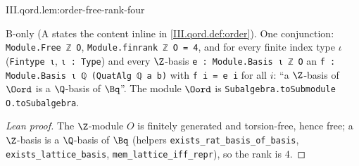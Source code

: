 \begin{lemma}
\bonly
{}
\end{lemma}
\begin{tfformal}{III.qord.lem:order-free-rank-four}
\begin{tffidelity}
B-only (A states the content inline in \cref{III.qord.def:order}). One conjunction: \texttt{Module.Free ℤ O}, \texttt{Module.finrank ℤ O = 4}, and for every finite index type $\iota$ (\texttt{Fintype ι}, \texttt{ι : Type}) and every $\Z$-basis \texttt{e : Module.Basis ι ℤ O} an \texttt{f : Module.Basis ι ℚ (QuatAlg ℚ a b)} with \texttt{f i = e i} for all $i$: ``a $\Z$-basis of $\Oord$ is a $\Q$-basis of $\Bq$''. The module $\Oord$ is \texttt{Subalgebra.toSubmodule O.toSubalgebra}.
\end{tffidelity}
\end{tfformal}
\begin{proof}[Lean proof]
The $\Z$-module $O$ is finitely generated and torsion-free, hence free; a $\Z$-basis is a $\Q$-basis of $\Bq$ (helpers \texttt{exists\_rat\_basis\_of\_basis}, \texttt{exists\_lattice\_basis}, \texttt{mem\_lattice\_iff\_repr}), so the rank is $4$.
\end{proof}

